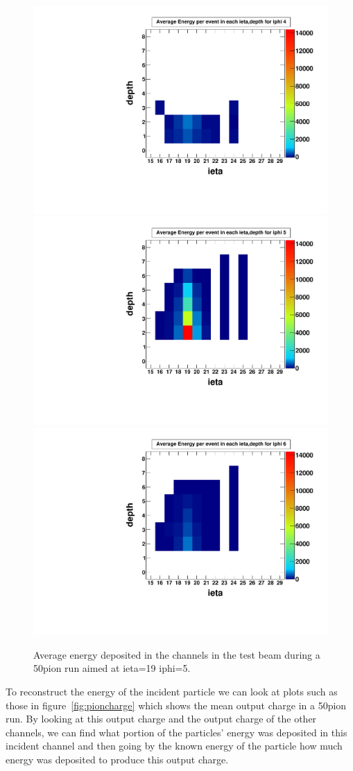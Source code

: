 \begin{figure}
\centering
\includegraphics[width=0.495\linewidth]{Figures/pionrun1.pdf}
\includegraphics[width=0.495\linewidth]{Figures/pionrun.pdf}
\includegraphics[width=0.495\linewidth]{Figures/pionrun2.pdf}
\caption{Average energy deposited in the channels in the test beam during a 50\GeV pion run aimed at ieta=19 iphi=5.}
\label{fig:pionmap}
\end{figure}

To reconstruct the energy of the incident particle we can look at plots such as those in figure~\ref{fig:pioncharge} which shows the mean output charge in a 50\GeV\space pion run. By looking at this output charge and the output charge of the other channels, we can find what portion of the particles' energy was deposited in this incident channel and then going by the known energy of the particle how much energy was deposited to produce this output charge. 

